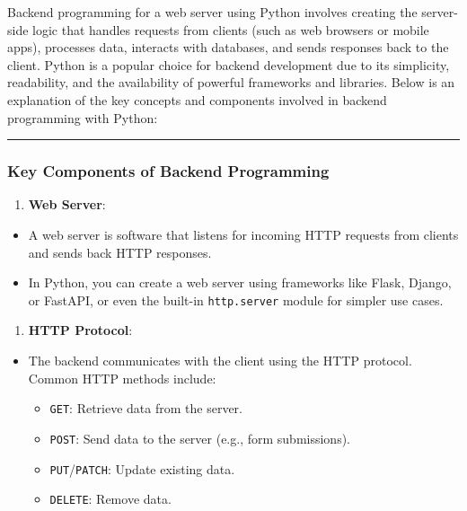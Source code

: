 \documentclass[11pt]{article}
\providecommand{\tightlist}{%
      \setlength{\itemsep}{0pt}\setlength{\parskip}{0pt}}
\begin{document}
Backend programming for a web server using Python involves creating the
server-side logic that handles requests from clients (such as web
browsers or mobile apps), processes data, interacts with databases, and
sends responses back to the client. Python is a popular choice for
backend development due to its simplicity, readability, and the
availability of powerful frameworks and libraries. Below is an
explanation of the key concepts and components involved in backend
programming with Python:

\begin{center}\rule{0.5\linewidth}{\linethickness}\end{center}

\subsubsection{\texorpdfstring{\textbf{Key Components of Backend
Programming}}{Key Components of Backend Programming}}\label{key-components-of-backend-programming}

\begin{enumerate}
\def\labelenumi{\arabic{enumi}.}
\tightlist
\item
  \textbf{Web Server}:
\end{enumerate}

\begin{itemize}
\tightlist
\item
  A web server is software that listens for incoming HTTP requests from
  clients and sends back HTTP responses.
\item
  In Python, you can create a web server using frameworks like Flask,
  Django, or FastAPI, or even the built-in \texttt{http.server} module
  for simpler use cases.
\end{itemize}

\begin{enumerate}
\def\labelenumi{\arabic{enumi}.}
\setcounter{enumi}{1}
\tightlist
\item
  \textbf{HTTP Protocol}:
\end{enumerate}

\begin{itemize}
\tightlist
\item
  The backend communicates with the client using the HTTP protocol.
  Common HTTP methods include:

  \begin{itemize}
  \tightlist
  \item
    \texttt{GET}: Retrieve data from the server.
  \item
    \texttt{POST}: Send data to the server (e.g., form submissions).
  \item
    \texttt{PUT}/\texttt{PATCH}: Update existing data.
  \item
    \texttt{DELETE}: Remove data.
  \end{itemize}
\end{itemize}
\end{document}
